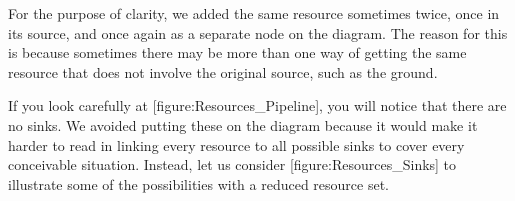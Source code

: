 For the purpose of clarity, we added the same resource sometimes twice, once in its source, and once again as a separate node on the diagram. The reason for this is because sometimes there may be more than one way of getting the same resource that does not involve the original source, such as the ground. 

If you look carefully at [figure:Resources_Pipeline], you will notice that there are no sinks. We avoided putting these on the diagram because it would make it harder to read in linking every resource to all possible sinks to cover every conceivable situation. Instead, let us consider [figure:Resources_Sinks] to illustrate some of the possibilities with a reduced resource set.

    {}


